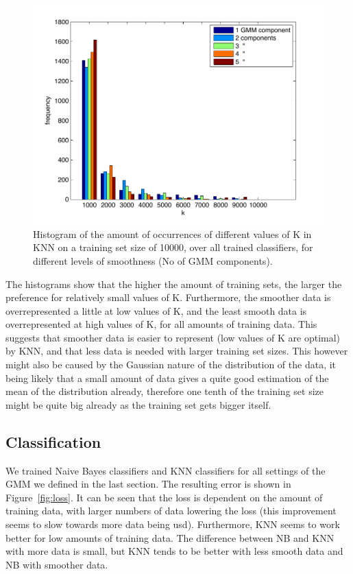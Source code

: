 \documentclass[a4paper]{article}
\begin{document}
\begin{figure}[htb]
    \centering
    \includegraphics[width=.9\textwidth]{Hist10000.pdf}
    \caption{Histogram of the amount of occurrences of different values of K in KNN on a training set size of 10000, over all trained classifiers, for different levels of smoothness (No of GMM components). \label{fig:hist10000}}
\end{figure}

The histograms show that the higher the amount of training sets, the larger the preference for relatively small values of K. Furthermore, the smoother data is overrepresented a little at low values of K, and the least smooth data is overrepresented at high values of K, for all amounts of training data. This suggests that smoother data is easier to represent (low values of K are optimal) by KNN, and that less data is needed with larger training set sizes. This however might also be caused by the Gaussian nature of the distribution of the data, it being likely that a small amount of data gives a quite good estimation of the mean of the distribution already, therefore one tenth of the training set size might be quite big already as the training set gets bigger itself. 

\subsection{Classification}
We trained Naive Bayes classifiers and KNN classifiers for all settings of the \ac{GMM} we defined in the last section. The resulting error is shown in Figure~\ref{fig:loss}. It can be seen that the loss is dependent on the amount of training data, with larger numbers of data lowering the loss (this improvement seems to slow towards more data being usd). Furthermore, KNN seems to work better for low amounts of training data. The difference between NB and KNN with more data is small, but KNN tends to be better with less smooth data and NB with smoother data.
\end{document}
